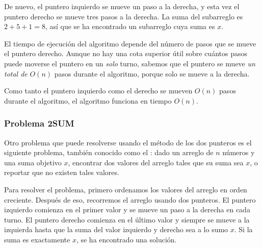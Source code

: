 De nuevo, el puntero izquierdo se mueve un paso a la derecha,
y esta vez el puntero derecho se mueve tres
pasos a la derecha.
La suma del subarreglo es $2+5+1=8$, así que se ha encontrado un subarreglo
cuya suma es $x$.

\begin{center}
\end{center}

El tiempo de ejecución del algoritmo depende del
número de pasos que se mueve el puntero derecho.
Aunque no hay una cota superior útil sobre cuántos pasos puede
moverse el puntero en un \emph{solo} turno,
sabemos que el puntero se mueve \emph{un total de}
$O(n)$ pasos durante el algoritmo,
porque solo se mueve a la derecha.

Como tanto el puntero izquierdo como el derecho
se mueven $O(n)$ pasos durante el algoritmo,
el algoritmo funciona en tiempo $O(n)$.

\subsubsection{Problema 2SUM}


Otro problema que puede resolverse usando
el método de los dos punteros es el siguiente problema,
también conocido como el :
dado un arreglo de $n$ números y
una suma objetivo $x$, encontrar
dos valores del arreglo tales que su suma sea $x$,
o reportar que no existen tales valores.

Para resolver el problema, primero
ordenamos los valores del arreglo en orden creciente.
Después de eso, recorremos el arreglo usando
dos punteros.
El puntero izquierdo comienza en el primer valor
y se mueve un paso a la derecha en cada turno.
El puntero derecho comienza en el último valor
y siempre se mueve a la izquierda hasta que la suma del
valor izquierdo y derecho sea a lo sumo $x$.
Si la suma es exactamente $x$,
se ha encontrado una solución.

